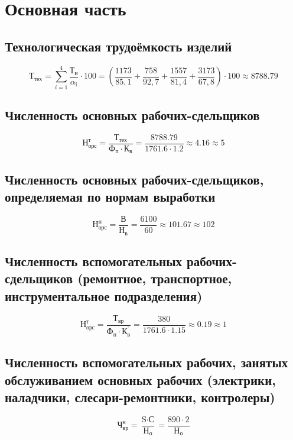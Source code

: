\chapter{Основная часть}


\section{Технологическая трудоёмкость изделий}
\[
\text{Т}_\text{тех}=\sum_{i=1}^{4} \frac{\text{Т}_\text{н}}{\alpha_\text{i}} \cdot 100 =\left( \frac{1173}{85,1}+\frac{758}{92,7}+\frac{1557}{81,4}+\frac{3173}{67,8}\right) \cdot 100 \approx 8788.79
\]


\section{Численность основных рабочих-сдельщиков}

\[
\text{Н}_\text{орс}^\text{т}=\frac{\text{Т}_\text{тех}}{\text{Ф}_\text{п} \cdot \text{К}_\text{в}}=\frac{8788.79}{1761.6 \cdot 1.2} \approx 4.16 \approx 5
\]


\section{Численность основных рабочих-сдельщиков, определяемая по нормам выработки}

\[
\text{Н}_\text{орс}^\text{н}=\frac{\text{В}}{\text{Н}_\text{в}}=\frac{6100}{60} \approx 101.67 \approx 102
\]

\section{Численность вспомогательных рабочих-сдельщиков (ремонтное, транспортное, инструментальное подразделения)}

\[
\text{Н}_\text{орс}^\text{т}=\frac{\text{Т}_\text{вр}}{\text{Ф}_\text{п} \cdot \text{К}_\text{в}^\text{'}}=\frac{380}{1761.6 \cdot 1.15} \approx 0.19 \approx 1
\]

\section{Численность вспомогательных рабочих, занятых обслуживанием основных рабочих (электрики, наладчики, слесари-ремонтники, контролеры)}

\[
\text{Ч}_\text{вр}^\text{н}=\frac{\text{S} \cdot \text{С}}{\text{Н}_\text{о}}= \frac{890 \cdot 2}{\text{Н}_\text{о}}
\]

